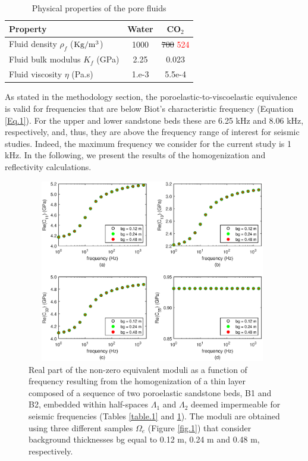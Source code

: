 \documentclass[draft]{agujournal2019}
\newcommand{\red}{\textcolor{red}}
\begin{document}
\begin{table}[!ht]
  \caption{Physical properties of the pore fluids}
\begin{center}
  \begin{tabular}{ | l  c  c |  }
    \hline
    Property & Water & CO$_2$\\ \hline
    Fluid density $\rho_f$ ($\rm{Kg/m^3}$) & 1000 & \st{700} \red{524}\\
    Fluid bulk modulus $K_f$ (\rm{GPa}) & 2.25 & 0.023\\
    Fluid viscosity $\eta$ (\rm{Pa.s})& 1.e-3 & 5.5e-4\\
    \hline
  \end{tabular}
  \label{table.2}
\end{center}
\end{table}

As stated in the methodology section, the poroelastic-to-viscoelastic equivalence is valid for frequencies that are below Biot's characteristic frequency (Equation \eqref{Eq.1}). For the upper and lower sandstone beds these are 6.25 kHz and 8.06 kHz, respectively, and, thus, they are above the frequency range of interest for seismic studies. Indeed, the maximum frequency we consider for the current study is 1 kHz. In the following, we present the results of the homogenization and reflectivity calculations.

\begin{figure}[!ht]
\centering
        \includegraphics[width=110mm, height=80mm]{Figure2.eps}
\caption{Real part of the non-zero equivalent moduli as a function of frequency resulting from the homogenization of a thin layer composed of a sequence of two poroelastic sandstone beds, B1 and B2, embedded within  half-spaces $\Lambda_1$ and $\Lambda_2$ deemed impermeable for seismic frequencies (Tables \ref{table.1} and \ref{table.2}). The moduli are obtained using three different samples $\Omega_e$ (Figure \ref{fig.1}) that consider background thicknesses bg equal to 0.12 m, 0.24 m and 0.48 m, respectively.}
\label{fig.2}
\end{figure}
\end{document}
